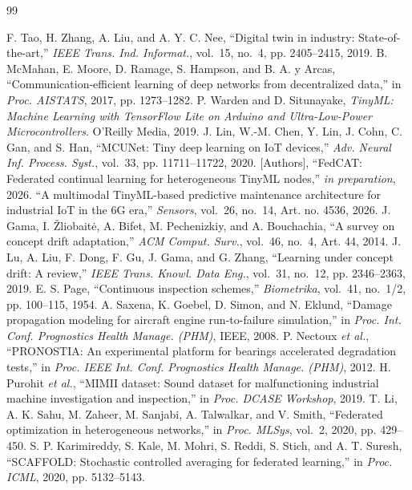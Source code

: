 \documentclass[journal]{IEEEtran}
\begin{document}

\begin{thebibliography}{99}

 F. Tao, H. Zhang, A. Liu, and A. Y. C. Nee, ``Digital twin in industry: State-of-the-art,'' \emph{IEEE Trans. Ind. Informat.}, vol.~15, no.~4, pp. 2405--2415, 2019.
 B. McMahan, E. Moore, D. Ramage, S. Hampson, and B. A. y Arcas, ``Communication-efficient learning of deep networks from decentralized data,'' in \emph{Proc. AISTATS}, 2017, pp. 1273--1282.
 P. Warden and D. Situnayake, \emph{TinyML: Machine Learning with TensorFlow Lite on Arduino and Ultra-Low-Power Microcontrollers}. O'Reilly Media, 2019.
 J. Lin, W.-M. Chen, Y. Lin, J. Cohn, C. Gan, and S. Han, ``MCUNet: Tiny deep learning on IoT devices,'' \emph{Adv. Neural Inf. Process. Syst.}, vol.~33, pp. 11711--11722, 2020.
 [Authors], ``FedCAT: Federated continual learning for heterogeneous TinyML nodes,'' \emph{in preparation}, 2026.
 ``A multimodal TinyML-based predictive maintenance architecture for industrial IoT in the 6G era,'' \emph{Sensors}, vol.~26, no.~14, Art. no. 4536, 2026.
 J. Gama, I. \v{Z}liobait\.{e}, A. Bifet, M. Pechenizkiy, and A. Bouchachia, ``A survey on concept drift adaptation,'' \emph{ACM Comput. Surv.}, vol.~46, no.~4, Art. 44, 2014.
 J. Lu, A. Liu, F. Dong, F. Gu, J. Gama, and G. Zhang, ``Learning under concept drift: A review,'' \emph{IEEE Trans. Knowl. Data Eng.}, vol.~31, no.~12, pp. 2346--2363, 2019.
 E. S. Page, ``Continuous inspection schemes,'' \emph{Biometrika}, vol.~41, no.~1/2, pp. 100--115, 1954.
 A. Saxena, K. Goebel, D. Simon, and N. Eklund, ``Damage propagation modeling for aircraft engine run-to-failure simulation,'' in \emph{Proc. Int. Conf. Prognostics Health Manage. (PHM)}, IEEE, 2008.
 P. Nectoux \emph{et al.}, ``PRONOSTIA: An experimental platform for bearings accelerated degradation tests,'' in \emph{Proc. IEEE Int. Conf. Prognostics Health Manage. (PHM)}, 2012.
 H. Purohit \emph{et al.}, ``MIMII dataset: Sound dataset for malfunctioning industrial machine investigation and inspection,'' in \emph{Proc. DCASE Workshop}, 2019.
 T. Li, A. K. Sahu, M. Zaheer, M. Sanjabi, A. Talwalkar, and V. Smith, ``Federated optimization in heterogeneous networks,'' in \emph{Proc. MLSys}, vol.~2, 2020, pp. 429--450.
 S. P. Karimireddy, S. Kale, M. Mohri, S. Reddi, S. Stich, and A. T. Suresh, ``SCAFFOLD: Stochastic controlled averaging for federated learning,'' in \emph{Proc. ICML}, 2020, pp. 5132--5143.

\end{thebibliography}
\end{document}
